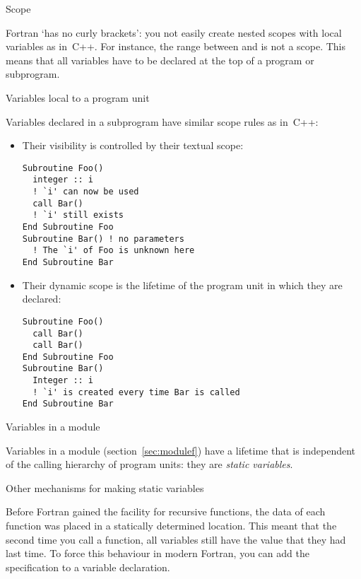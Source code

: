 
 {Scope}

Fortran `has no curly brackets': you not easily create nested
scopes with local variables as in~C++.
For instance, the range between  and  is not a scope.
This means that all variables have to be declared at the top of a
program or subprogram.

 {Variables local to a program unit}

Variables declared in a subprogram have similar scope rules as in~C++:
\begin{itemize}
\item Their visibility is controlled by their textual scope:
\begin{lstlisting}
Subroutine Foo()
  integer :: i
  ! `i' can now be used
  call Bar()
  ! `i' still exists
End Subroutine Foo
Subroutine Bar() ! no parameters
  ! The `i' of Foo is unknown here
End Subroutine Bar
\end{lstlisting}
\item Their dynamic scope is the lifetime of the program unit in which
  they are declared:
\begin{lstlisting}
Subroutine Foo()
  call Bar()
  call Bar()
End Subroutine Foo
Subroutine Bar()
  Integer :: i
  ! `i' is created every time Bar is called
End Subroutine Bar
\end{lstlisting}
\end{itemize}

 {Variables in a module}

Variables in a module (section~\ref{sec:modulef}) have a lifetime that
is independent of the calling hierarchy of program units: they are
\emph{static variables}.

 {Other mechanisms for making static variables}

Before Fortran gained the facility for recursive functions, the data
of each function was placed in a statically determined location. This
meant that the second time you call a function, all variables still
have the value that they had last time. To force this behaviour
in modern Fortran, you can add the  specification
to a variable declaration.

